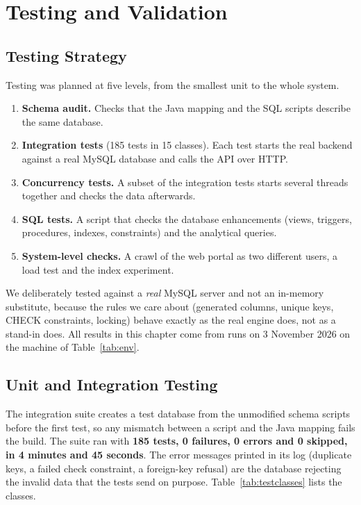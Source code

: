 \chapter{Testing and Validation}\label{ch:test}

\section{Testing Strategy}
Testing was planned at five levels, from the smallest unit to the whole system.
\begin{enumerate}
\item \textbf{Schema audit.} Checks that the Java mapping and the SQL scripts describe the same database.
\item \textbf{Integration tests} (185 tests in 15 classes). Each test starts the real backend against a real MySQL database and calls the API over HTTP.
\item \textbf{Concurrency tests.} A subset of the integration tests starts several threads together and checks the data afterwards.
\item \textbf{SQL tests.} A script that checks the database enhancements (views, triggers, procedures, indexes, constraints) and the analytical queries.
\item \textbf{System-level checks.} A crawl of the web portal as two different users, a load test and the index experiment.
\end{enumerate}
We deliberately tested against a \emph{real} MySQL server and not an in-memory substitute, because
the rules we care about (generated columns, unique keys, CHECK constraints, locking)
behave exactly as the real engine does, not as a stand-in does. All results in this
chapter come from runs on 3 November 2026 on the machine of Table~\ref{tab:env}.

\section{Unit and Integration Testing}\label{sec:unit}
The integration suite creates a test database from the unmodified schema scripts before
the first test, so any mismatch between a script and the Java mapping fails the build.
The suite ran with \textbf{185 tests, 0 failures, 0 errors and 0 skipped, in 4 minutes and
45 seconds}. The error messages printed in its log (duplicate keys, a failed check
constraint, a foreign-key refusal) are the database rejecting the invalid data that the
tests send on purpose. Table~\ref{tab:testclasses} lists the classes.

